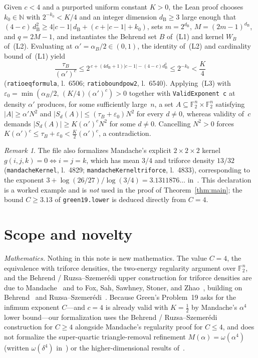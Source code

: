 \documentclass[11pt,reqno]{amsart}
\theoremstyle{remark}
\newtheorem{remark}[theorem]{Remark}
\newcommand{\F}{\mathbb{F}}
\newcommand{\N}{\mathbb{N}}
\newcommand{\LeanUS}{\textunderscore\hspace{0pt}}
\newcommand{\lean}[1]{{\let\_\LeanUS\texttt{#1}}}
\begin{document}
Given $c < 4$ and a purported uniform constant $K > 0$, the Lean proof chooses $k_0 \in \N$ with $2^{-k_0} < K / 4$ and an integer dimension $d_{\mathrm{B}} \ge 3$ large enough that $(4 - c)\, d_{\mathrm{B}}^2 \ge 4|c - 1|\, d_{\mathrm{B}} + (c + |c - 1| + k_0)$, sets $m = 2^{d_{\mathrm{B}}}$, $M = (2m - 1)^{d_{\mathrm{B}}}$, and $q = 2M - 1$, and instantiates the Behrend set $B$ of~(L1) and kernel $W_B$ of~(L2). Evaluating at $\alpha' = \alpha_B / 2 \in (0, 1)$, the identity of~(L2) and cardinality bound of~(L1) yield
\[
  \frac{\tau_B}{(\alpha')^c} \le 2^{\,c + (4 d_{\mathrm{B}} + 1)|c - 1| - (4 - c) d_{\mathrm{B}}^2} \le 2^{-k_0} < \frac{K}{4}
\]
(\lean{ratio\_eq\_formula}, l.~6506; \lean{ratio\_bound\_pow2}, l.~6540). Applying~(L3) with $\varepsilon_0 = \min(\alpha_B / 2,\, (K / 4)(\alpha')^c) > 0$ together with \lean{ValidExponent c} at density $\alpha'$ produces, for some sufficiently large~$n$, a set $A \subseteq \F_2^n \times \F_2^n$ satisfying $|A| \ge \alpha' N^2$ and $|S_d(A)| \le (\tau_B + \varepsilon_0) N^2$ for every $d \neq 0$, whereas validity of~$c$ demands $|S_d(A)| \ge K (\alpha')^c N^2$ for some $d \neq 0$. Cancelling $N^2 > 0$ forces $K (\alpha')^c \le \tau_B + \varepsilon_0 < \tfrac{K}{2} (\alpha')^c$, a contradiction.

\begin{remark}\label{rem:mandache}
The file also formalizes Mandache's explicit $2 \times 2 \times 2$ kernel $g(i, j, k) = 0 \iff i = j = k$, which has mean $3/4$ and triforce density $13/32$ (\lean{mandacheKernel}, l.~4829; \lean{mandacheKernel\_\allowbreak triforce}, l.~4833), corresponding to the exponent $3 + \log(26/27)/\log(3/4) = 3.1311876\dots$ in~\cite{Mandache}. This declaration is a worked example and is \emph{not} used in the proof of Theorem~\ref{thm:main}; the bound $C \ge 3.13$ of \lean{green\_19.\allowbreak{}lower} is deduced directly from $C = 4$.
\end{remark}

\section{Scope and novelty}\label{sec:scope}

\emph{Mathematics.} Nothing in this note is new mathematics. The value $C = 4$, the equivalence with triforce densities, the two-energy regularity argument over $\F_2^n$, and the Behrend / Ruzsa--Szemer\'edi upper construction for triforce densities are due to Mandache~\cite{Mandache} and to Fox, Sah, Sawhney, Stoner, and Zhao~\cite{FSSSZ}, building on Behrend~\cite{Behrend} and Ruzsa--Szemer\'edi~\cite{RS}. Because Green's Problem~19 asks for the infimum exponent $C$---and $c = 4$ is already valid with $K = \tfrac{1}{2}$ by Mandache's $\alpha^4$ lower bound---our formalization uses the Behrend / Ruzsa--Szemer\'edi construction for $C \ge 4$ alongside Mandache's regularity proof for $C \le 4$, and does not formalize the super-quartic triangle-removal refinement $M(\alpha) = \omega(\alpha^4)$ (written $\omega(\delta^4)$ in~\cite{FSSSZ}) or the higher-dimensional results of~\cite{FSSSZ}.
\end{document}
